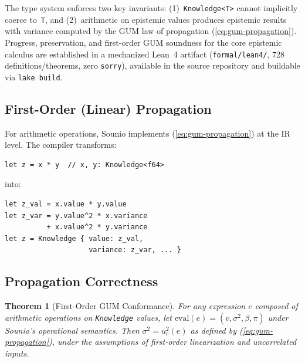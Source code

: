 \documentclass[journal]{IEEEtran}
\newtheorem{theorem}{Theorem}
\begin{document}
The type system enforces two key invariants: (1)~\texttt{Knowledge<T>}
cannot implicitly coerce to~\texttt{T}, and (2)~arithmetic on epistemic
values produces epistemic results with variance computed by the GUM law
of propagation (\ref{eq:gum-propagation}). Progress, preservation, and
first-order GUM soundness for the core epistemic calculus are established
in a mechanized Lean~4 artifact (\texttt{formal/lean4/}, 728
definitions/theorems, zero \texttt{sorry}), available in the source
repository and buildable via \texttt{lake build}.

\subsection{First-Order (Linear) Propagation}
\label{sec:propagation}

For arithmetic operations, Sounio implements (\ref{eq:gum-propagation})
at the IR level. The compiler transforms:
\begin{lstlisting}
let z = x * y  // x, y: Knowledge<f64>
\end{lstlisting}
into:
\begin{lstlisting}
let z_val = x.value * y.value
let z_var = y.value^2 * x.variance
          + x.value^2 * y.variance
let z = Knowledge { value: z_val,
                    variance: z_var, ... }
\end{lstlisting}

\subsection{Propagation Correctness}

\begin{theorem}[First-Order GUM Conformance]
\label{thm:gum-compliance}
For any expression $e$ composed of arithmetic operations on
\texttt{Knowledge} values, let
$\text{eval}(e) = (v, \sigma^2, \beta, \pi)$ under Sounio's operational
semantics. Then $\sigma^2 = u_c^2(e)$ as defined by
(\ref{eq:gum-propagation}), under the assumptions of first-order
linearization and uncorrelated inputs.
\end{theorem}
\end{document}
